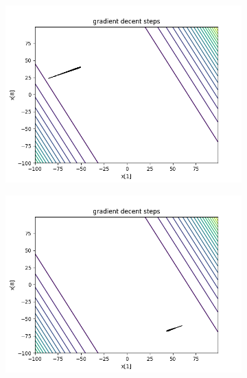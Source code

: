 	\begin{figure}[h!]
		\centering
		\begin{subfigure}[b]{0.45\linewidth}
			\includegraphics[width=\linewidth]{photos/f3_1_0.png}
		\end{subfigure}
		\begin{subfigure}[b]{0.45\linewidth}
			\includegraphics[width=\linewidth]{photos/f3_2_0.png}
		\end{subfigure}
		\begin{subfigure}[b]{0.45\linewidth}

\end{subfigure}
\end{figure}
